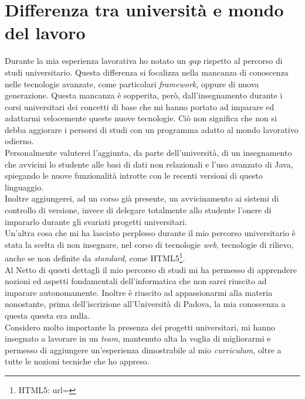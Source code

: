 \section{Differenza tra università e mondo del lavoro}
Durante la mia esperienza lavorativa ho notato un \textit{gap} rispetto al percorso di studi universitario. Questa differenza si focalizza nella mancanza di conoscenza nelle tecnologie avanzate, come particolari \textit{framework}, oppure di nuova generazione. Questa mancanza è sopperita, però, dall'insegnamento durante i corsi universitari dei concetti di base che mi hanno portato ad imparare ed adattarmi velocemente queste nuove tecnologie. Ciò non significa che non si debba aggiorare i persorsi di studi con un programma adatto al mondo lavorativo odierno.\\ Personalmente valuterei l'aggiunta, da parte dell'università, di un insegnamento che avvicini lo studente alle basi di dati non relazionali e l'uso avanzato di Java, spiegando le nuove funzionalità introtte con le recenti versioni di questo linguaggio.\\
Inoltre aggiungerei, ad un corso già presente, un avvicinamento ai sistemi di controllo di versione, invece di delegare totalmente allo studente l'onere di impararlo durante gli svariati progetti universitari.\\
Un'altra cosa che mi ha lasciato perplesso durante il mio percorso universitario è stata la scelta di non insegnare, nel corso di tecnologie \textit{web}, tecnologie di rilievo, anche se non definite da \textit{standard}, come HTML5\footnote{HTML5: url= }.\\
Al Netto di questi dettagli il mio percorso di studi mi ha permesso di apprendere nozioni ed aspetti fondamentali dell'informatica che non sarei riuscito ad imparare autonomamente. Inoltre è riuscito ad appassionarmi alla materia nonostante, prima dell'iscrizione all'Università di Padova, la mia conoscenza a questa questa era nulla. \\Considero molto importante la presenza dei progetti universitari, mi hanno insegnato a lavorare in un \textit{team}, mantenuto alta la voglia di migliorarmi e permesso di aggiungere un'esperienza dimostrabile al mio \textit{curriculum}, oltre a tutte le nozioni tecniche che ho appreso.

